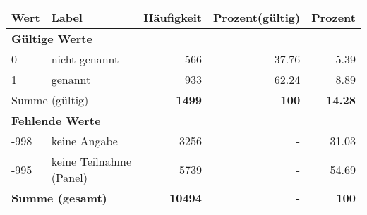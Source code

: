      \begin{longtable}{lXrrr}
     \toprule
     \textbf{Wert} & \textbf{Label} & \textbf{Häufigkeit} & \textbf{Prozent(gültig)} & \textbf{Prozent} \\
     \endhead
     \midrule
     \multicolumn{5}{l}{\textbf{Gültige Werte}}\\

     0 &
     \multicolumn{1}{X}{ nicht genannt   } &


       \num{566} &
       \num[round-mode=places,round-precision=2]{37.76} &
         \num[round-mode=places,round-precision=2]{5.39} \\

     1 &
     \multicolumn{1}{X}{ genannt   } &


       \num{933} &
       \num[round-mode=places,round-precision=2]{62.24} &
         \num[round-mode=places,round-precision=2]{8.89} \\
     \midrule
     \multicolumn{2}{l}{Summe (gültig)} &
       \textbf{\num{1499}} &
     \textbf{\num{100}} &
       \textbf{\num[round-mode=places,round-precision=2]{14.28}} \\
     \multicolumn{5}{l}{\textbf{Fehlende Werte}}\\
       -998 &
       keine Angabe &
         \num{3256} &
        - &
         \num[round-mode=places,round-precision=2]{31.03} \\
       -995 &
       keine Teilnahme (Panel) &
         \num{5739} &
        - &
         \num[round-mode=places,round-precision=2]{54.69} \\
     \midrule
     \multicolumn{2}{l}{\textbf{Summe (gesamt)}} &
          \textbf{\num{10494}} &
        \textbf{-} &
        \textbf{\num{100}} \\
     \bottomrule
     \end{longtable}
     
